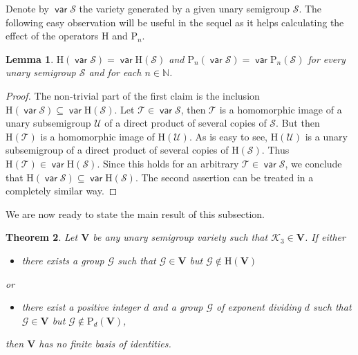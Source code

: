 \documentclass[11pt,reqno]{amsart}
\DeclareMathOperator{\var}{\mathsf{var}}
\numberwithin{equation}{section}
\def\bb{\mathbb}
\newtheorem{Thm}{Theorem}[section]
\newtheorem{Lemma}[Thm]{Lemma}
\theoremstyle{remark}
\def\cal{\mathcal}
\def\Sc{{\cal S}}
\def\Tc{{\cal T}}
\def\Uc{{\cal U}}
\def\Vc{\mathbf{V}}
\def\H{\mathrm H}
\def\P{\mathrm P\!}
\begin{document}
Denote by $\var\Sc$ the variety generated by a given unary
semigroup $\Sc$. The following easy observation will be useful in
the sequel as it helps calculating the effect of the operators
$\H$ and $\P_n$.

\begin{Lemma}\label{Lemma 3.1}
$\H(\var\Sc)=\var\H(\Sc)$ and $\P_n(\var\Sc)= \var\P_n(\Sc)$ for
every unary semigroup $\Sc$ and for each $n\in \bb N$.
\end{Lemma}

\begin{proof}
The non-trivial part of the first claim is the inclusion
$\H(\var\Sc)\subseteq\var\H(\Sc)$. Let $\Tc\in\var\Sc$, then $\Tc$
is a homomorphic image of a unary subsemigroup $\Uc$ of a direct
product of several copies of $\Sc$. But then $\H(\Tc)$ is a
homomorphic image of $\H(\Uc)$. As is easy to see, $\H(\Uc)$ is a
unary subsemigroup of a direct product of several copies of
$\H(\Sc)$. Thus $\H(\Tc)\in\var\H(\Sc)$. Since this holds for an
arbitrary $\Tc\in\var\Sc$, we conclude that
$\H(\var\Sc)\subseteq\var\H(\Sc)$. The second assertion can be
treated in a completely similar way.
\end{proof}

We are now ready to state the main result of this subsection.

\begin{Thm}\label{Theorem 2.1}
Let $\Vc$ be any unary semigroup variety such that
$\mathcal{K}_3\in\Vc$. If either
\begin{itemize}
\item there exists a group $\mathcal{G}$  such that $\mathcal{G}\in\Vc$ but
$\mathcal{G}\notin\H(\Vc)$
\end{itemize}
or
\begin{itemize}
\item there exist a positive integer $d$ and a group $\mathcal{G}$ of exponent
dividing $d$ such that $\mathcal{G}\in\Vc$ but
$\mathcal{G}\notin\P_d(\Vc)$,
\end{itemize}
then $\Vc$ has no finite basis of identities.
\end{Thm}
\end{document}
